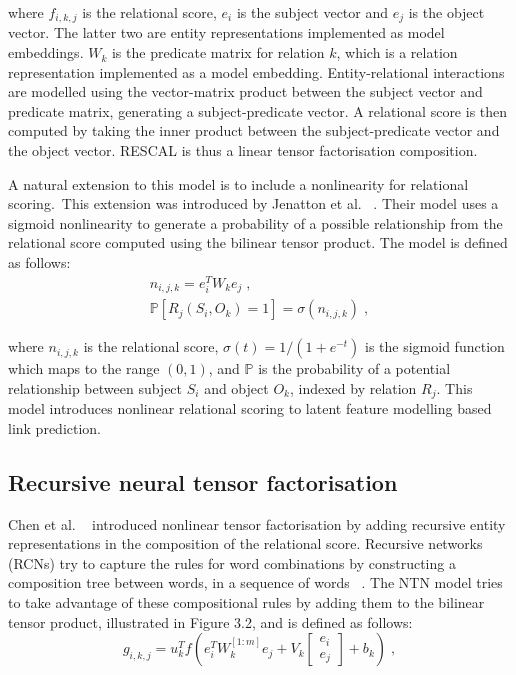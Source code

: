 \noindent where $ f_{i,k,j} $ is the relational score, $ e_i $ is the subject vector and $ e_j $ is the object vector. The latter two are entity representations implemented as model embeddings. $ W_k $ is the predicate matrix for relation $ k $, which is a relation representation implemented as a model embedding. Entity-relational interactions are modelled using the vector-matrix product between the subject vector and predicate matrix, generating a subject-predicate vector. A relational score is then computed by taking the inner product between the subject-predicate vector and the object vector. RESCAL is thus a linear tensor factorisation composition. \par

\noindent A natural extension to this model is to include a nonlinearity for relational scoring.\ This extension was introduced by Jenatton et al. \unskip ~\citep{jenatton2012latent}. Their model uses a sigmoid nonlinearity to generate a probability of a possible relationship from the relational score computed using the bilinear tensor product. The model is defined as follows:
\begin{subequations}
	\begin{gather}
		n_{i,j,k} = e_i^TW_ke_j \; , \\
		\mathbb{P}\left [ R_j(S_i, O_k) = 1 \right ] = \sigma(n_{i,j,k}) \; ,
	\end{gather}
\end{subequations}

\noindent where $ n_{i,j,k} $ is the relational score, $ \sigma(t) = 1/(1 + e^{-t}) $ is the sigmoid function which maps to the range $ (0,1) $, and $\mathbb{P}$ is the probability of a potential relationship between subject $ S_i $ and object $ O_k $, indexed by relation $ R_j $. This model introduces nonlinear relational scoring to latent feature modelling based link prediction. 



\subsection{Recursive neural tensor factorisation}

Chen et al. \unskip ~\citep{socher2013reasoning} introduced nonlinear tensor factorisation by adding recursive entity representations in the composition of the relational score. Recursive networks (RCNs) try to capture the rules for word combinations by constructing a composition tree between words, in a sequence of words \unskip ~\citep{socher2012semantic}. The NTN model tries to take advantage of these compositional rules by adding them to the bilinear tensor product, illustrated in Figure 3.2, and is defined as follows:
\begin{equation}
	g_{i,k,j} =  u_k^Tf(e_i^TW_k^{\left [1:m \right ]} e_j + V_k \left [ \begin{matrix} e_i \\ e_j \end{matrix} \right ] + b_k) \; ,
\end{equation}


